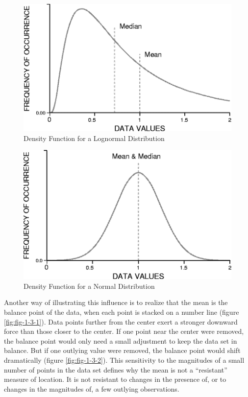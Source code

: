 \documentclass[]{book}
\begin{document}
\begin{figure}

{\centering \includegraphics{figures/1_1} 

}

\caption{Density Function for a Lognormal Distribution}\label{fig:fig-1-1}
\end{figure}
\begin{figure}

{\centering \includegraphics{figures/1_2} 

}

\caption{Density Function for a Normal Distribution}\label{fig:fig-1-2}
\end{figure}

Another way of illustrating this influence is to realize that the mean is the balance point of the data, when each point is stacked on a number line (figure \ref{fig:fig-1-3-1}). Data points further from the center exert a stronger downward force than those closer to the center. If one point near the center were removed, the balance point would only need a small adjustment to keep the data set in balance. But if one outlying value were removed, the balance point would shift dramatically (figure \ref{fig:fig-1-3-2}). This sensitivity to the magnitudes of a small number of points in the data set defines why the mean is not a ``resistant'' measure of location. It is not resistant to changes in the presence of, or to changes in the magnitudes of, a few outlying observations.
\end{document}
